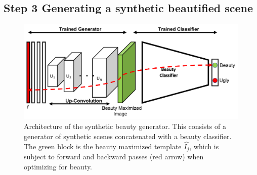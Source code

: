 

\subsection*{Step 3 Generating a synthetic beautified scene}

\begin{figure}[t!]
    \centering
    \includegraphics[width=\columnwidth]{AM_arch.pdf}
    \caption{Architecture of the synthetic beauty generator. This consists of a generator of synthetic scenes concatenated with a beauty classifier. The green block is the beauty maximized template $\hat{I_j}$, which is subject to  forward and backward passes (red arrow) when optimizing for beauty.}
    \label{fig:AM_arch}
\end{figure}

